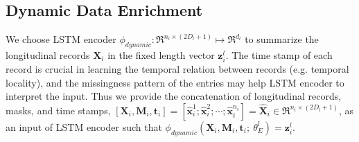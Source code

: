 \subsection{Dynamic Data Enrichment}
We choose LSTM encoder $\phi_{dynamic}: \Re^{n_i \times (2 D_l + 1)} \mapsto \Re^{d_l}$ to summarize the longitudinal records $\mathbf{X}_i$ in the fixed length vector $\mathbf{z}_i^l$. The time stamp of each record is crucial in learning the temporal relation between records (e.g. temporal locality), and the missingness pattern of the entries may help LSTM encoder to interpret the input. Thus we provide the concatenation of longitudinal records, masks, and time stamps, $[\mathbf{X}_i, \mathbf{M}_i, \mathbf{t}_i] = [\hat{\mathbf{x}}_i^1; \hat{\mathbf{x}}_i^2; \cdots; \hat{\mathbf{x}}_i^{n_i}] = \hat{\mathbf{X}}_i \in \Re^{n_i \times (2 D_l + 1)}$, as an input of LSTM encoder such that $\phi_{dynamic}(\mathbf{X}_i, \mathbf{M}_i, \mathbf{t}_i;\ \theta_{E}^l) = \mathbf{z}_i^l$. 

